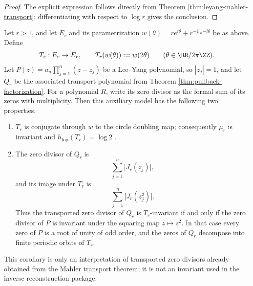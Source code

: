 \begin{proof}
The explicit expression follows directly from Theorem \ref{thm:leyang-mahler-transport}; differentiating with respect to \(\log r\) gives the conclusion.
\end{proof}

\begin{corollary}\label{cor:leyang-ellipse-doubling-shift}
Let \(r>1\), and let \(E_r\) and its parametrization \(w(\theta)=r e^{i\theta}+r^{-1}e^{-i\theta}\) be as above. Define
\[
T_r:E_r\to E_r,\qquad T_r(w(\theta)):=w(2\theta)\qquad(\theta\in\RR/2\pi\ZZ).
\]
Let \(P(z)=a_n\prod_{j=1}^{n}(z-z_j)\) be a Lee--Yang polynomial, so \(|z_j|=1\), and let \(Q_r\) be the associated transport polynomial from Theorem \ref{thm:pullback-factorization}. For a polynomial \(R\), write its zero divisor as the formal sum of its zeros with multiplicity. Then this auxiliary model has the following two properties.
\begin{enumerate}
  \item \(T_r\) is conjugate through \(w\) to the circle doubling map; consequently \(\mu_r\) is invariant and \(h_{\mathrm{top}}(T_r)=\log 2\) \citep{Walters1982}.
  \item The zero divisor of \(Q_r\) is
  \[
  \sum_{j=1}^{n}\bigl[J_r(z_j)\bigr],
  \]
  and its image under \(T_r\) is
  \[
  \sum_{j=1}^{n}\bigl[J_r(z_j^2)\bigr].
  \]
  Thus the transported zero divisor of \(Q_r\) is \(T_r\)-invariant if and only if the zero divisor of \(P\) is invariant under the squaring map \(z\mapsto z^2\). In that case every zero of \(P\) is a root of unity of odd order, and the zeros of \(Q_r\) decompose into finite periodic orbits of \(T_r\).
\end{enumerate}
This corollary is only an interpretation of transported zero divisors already obtained from the Mahler transport theorem; it is not an invariant used in the inverse reconstruction package.
\end{corollary}

